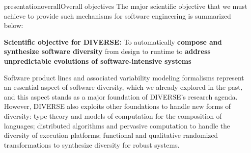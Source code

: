 \documentclass{ra2018}
\newcommand{\team}{DIVERSE}
\begin{document}
\begin{module}{presentation}{overall}{Overall objectives}
  The major scientific objective that we must achieve to provide such mechanisms for software engineering is summarized below:


    \textbf{Scientific objective for \team{}:} To automatically \textbf{compose and synthesize software diversity} from design to runtime to \textbf{address unpredictable evolutions of software-intensive systems} 

  Software product lines and associated variability modeling formalisms represent an essential aspect of software diversity, which we already explored in the past, and this aspect stands as a major foundation of \team{}'s research agenda. 
  However, \team{}  also exploits other foundations to handle new forms of diversity: type theory and models of computation for the composition of languages; distributed algorithms and pervasive computation to handle the diversity of execution platforms;  functional and qualitative randomized transformations to synthesize diversity for robust systems.






\end{module}



\end{document}
